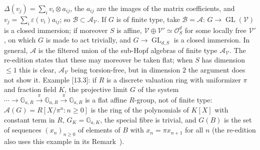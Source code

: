 \(\Delta(v_j)=\sum_iv_i\otimes a_{ij}\), the \(a_{ij}\) are the images of the matrix
coefficients, and \(v_j=\sum_i\varepsilon(v_i)a_{ij}\); so
\(\mathcal B\subset\mathcal A_{\mathcal V}\). If \(G\) is of finite type, take
\(\mathcal B=\mathcal A\): \(G\to\operatorname{GL}(\mathcal V)\) is a closed immersion; if
moreover \(S\) is affine, \(\mathcal V\oplus\mathcal V'\simeq\mathcal O_S^d\) for some locally
free \(\mathcal V'\), on which \(G\) is made to act trivially, and \(G\to\operatorname{GL}_{d,S}\)
is a closed immersion. In general, \(\mathcal A\) is the filtered union of the sub-Hopf algebras
of finite type \(\mathcal A_{\mathcal V}\). The re-edition states that these may moreover be
taken flat; when \(S\) has dimension \(\leq1\) this is clear, \(\mathcal A_{\mathcal V}\) being
torsion-free, but in dimension \(2\) the argument does not show it. Example [13.3]: if \(R\) is
a discrete valuation ring with uniformizer \(\pi\) and fraction field \(K\), the projective
limit \(G\) of the system
\(\cdots\to\mathbb G_{a,R}\xrightarrow{\ \pi\ }\mathbb G_{a,R}\xrightarrow{\ \pi\ }\mathbb G_{a,R}\)
is a flat affine \(R\)-group, not of finite type: \(\mathcal A(G)=R[X/\pi^n:n\geq0]\) is the
ring of the polynomials of \(K[X]\) with constant term in \(R\), \(G_K=\mathbb G_{a,K}\), the
special fibre is trivial, and \(G(B)\) is the set of sequences \((x_n)_{n\geq0}\) of elements
of \(B\) with \(x_n=\pi x_{n+1}\) for all \(n\) (the re-edition also uses this example in its
Remark~).

